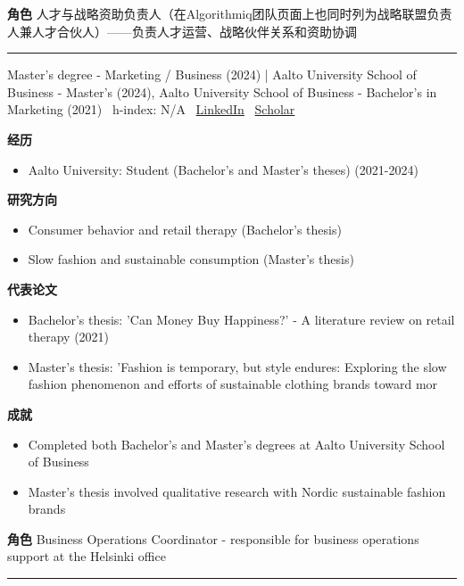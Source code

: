 \par{\footnotesize\color{mainred}\textbf{角色}} {\footnotesize 人才与战略资助负责人（在Algorithmiq团队页面上也同时列为战略联盟负责人兼人才合伙人）——负责人才运营、战略伙伴关系和资助协调}
\vspace{2pt}\hrule\vspace{2pt}
\vspace{4pt}
\par{\footnotesize\color{graytext}Master's degree - Marketing / Business (2024) | Aalto University School of Business - Master's (2024), Aalto University School of Business - Bachelor's in Marketing (2021) \textbar\  h-index: N/A \textbar\  \href{https://www.linkedin.com/in/emilia-silius/}{LinkedIn} \textbar\  \href{N/A}{Scholar}}
\par{\footnotesize\color{mainred}\textbf{经历}}
\begin{itemize}[leftmargin=1.2em,itemsep=0pt,topsep=0pt]
\item {\footnotesize Aalto University: Student (Bachelor's and Master's theses) (2021-2024)}
\end{itemize}
\par{\footnotesize\color{mainred}\textbf{研究方向}}
\begin{itemize}[leftmargin=1.2em,itemsep=0pt,topsep=0pt]
\item {\footnotesize Consumer behavior and retail therapy (Bachelor's thesis)}
\item {\footnotesize Slow fashion and sustainable consumption (Master's thesis)}
\end{itemize}
\par{\footnotesize\color{mainred}\textbf{代表论文}}
\begin{itemize}[leftmargin=1.2em,itemsep=0pt,topsep=0pt]
\item {\footnotesize Bachelor's thesis: 'Can Money Buy Happiness?' - A literature review on retail therapy (2021)}
\item {\footnotesize Master's thesis: 'Fashion is temporary, but style endures: Exploring the slow fashion phenomenon and efforts of sustainable clothing brands toward mor}
\end{itemize}
\par{\footnotesize\color{mainred}\textbf{成就}}
\begin{itemize}[leftmargin=1.2em,itemsep=0pt,topsep=0pt]
\item {\footnotesize Completed both Bachelor's and Master's degrees at Aalto University School of Business}
\item {\footnotesize Master's thesis involved qualitative research with Nordic sustainable fashion brands}
\end{itemize}
\par{\footnotesize\color{mainred}\textbf{角色}} {\footnotesize Business Operations Coordinator - responsible for business operations support at the Helsinki office}
\vspace{2pt}\hrule\vspace{2pt}
